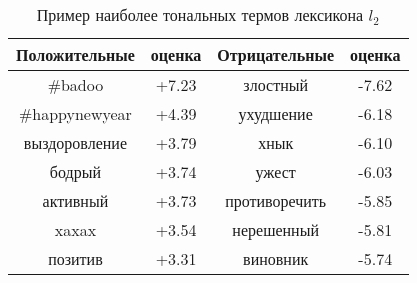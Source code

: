 \begin{table}[htp!] \centering
\caption{Пример наиболее тональных термов лексикона $l_2$}
\label{table:jan_lexicon}
\begin{tabular}{cccc}
\hline
\multicolumn{1}{c|}{Положительные}& \multicolumn{1}{c|}{оценка} & \multicolumn{1}{c|}{Отрицательные} & оценка \\ \hline
\#badoo                           & +7.23                       & злостный                           & -7.62 \\
\#happynewyear                    & +4.39                       & ухудшение                          & -6.18 \\
выздоровление                     & +3.79                       & хнык                               & -6.10 \\
бодрый                            & +3.74                       & ужест                              & -6.03 \\
активный                          & +3.73                       & противоречить                      & -5.85 \\
xaxax                             & +3.54                       & нерешенный                         & -5.81 \\
позитив                           & +3.31                       & виновник                           & -5.74 \\ \hline
\end{tabular}
\end{table}

